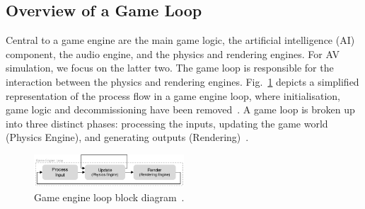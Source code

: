 \documentclass[letterpaper, 10 pt, journal, twoside]{IEEEtran}
\begin{document}
\subsection{Overview of a Game Loop} \label{GameLoopSection}

Central to a game engine are the main game logic, the artificial intelligence (AI) component, the audio engine, and the physics and rendering engines. For AV simulation, we focus on the latter two.
%
The game loop is responsible for the interaction between the physics and rendering engines. Fig.~\ref{GameEngineLoopDiagram} depicts a simplified representation of the process flow in a game engine loop, where  initialisation, game logic and decommissioning have been removed~\cite{unity_event_execution}.
A game loop is broken up into three distinct phases: processing the inputs, updating the game world (Physics Engine), and generating outputs (Rendering)~\cite{GameEngineArchBook}.

\begin{figure}[h]
\centering
\includegraphics[width=0.5\textwidth]{Other/Figures/GameEngineLoopv2.pdf}
\caption{Game engine loop block diagram~\cite{GameProgPatternsBook}.}
\label{GameEngineLoopDiagram}
\end{figure}



\end{document}
